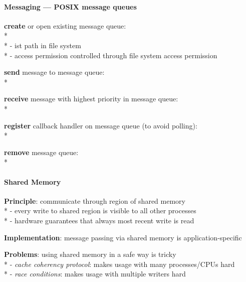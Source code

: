 \paragraph{Messaging --- POSIX message queues}
\begin{items}
  \item \textbf{create} or open existing message queue: \\*
     \\*
    -  ist path in file system \\*
    - access permission controlled through file system access permission
  \item \textbf{send} message to message queue: \\*
  \item \textbf{receive} message with highest priority in message queue: \\*
  \item \textbf{register} callback handler on message queue (to avoid polling): \\*
  \item \textbf{remove} message queue: \\*
\end{items}

\paragraph{Shared Memory}
\begin{items}
  \item \textbf{Principle}: communicate through region of shared memory \\*
    - every write to shared region is visible to all other processes \\*
    - hardware guarantees that always most recent write is read
  \item \textbf{Implementation}: message passing via shared memory is application-specific
  \item \textbf{Problems}: using shared memory in a safe way is tricky \\*
    - \emph{cache coherency protocol}: makes usage with many processes/CPUs hard \\*
    - \emph{race conditions}: makes usage with multiple writers hard
\end{items}

